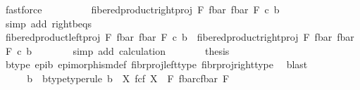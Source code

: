 \begin{isabellebody}
\ fastforce\isanewline
\ \ \ \ \isamarkupfalse%
\ \isamarkupfalse%
\ {\isachardoublequoteopen}{\isachardot}{\kern0pt}{\isachardot}{\kern0pt}{\isachardot}{\kern0pt}\ {\isacharequal}{\kern0pt}\ fibered{\isacharunderscore}{\kern0pt}product{\isacharunderscore}{\kern0pt}right{\isacharunderscore}{\kern0pt}proj\ F\ {\isacharparenleft}{\kern0pt}f{\isacharunderscore}{\kern0pt}bar{\isacharparenright}{\kern0pt}\ {\isacharparenleft}{\kern0pt}f{\isacharunderscore}{\kern0pt}bar{\isacharparenright}{\kern0pt}\ F\ {\isasymcirc}\isactrlsub c\ b{\isachardoublequoteclose}\isanewline
\ \ \ \ \ \ \isamarkupfalse%
\ {\isacharparenleft}{\kern0pt}simp\ add{\isacharcolon}{\kern0pt}\ right{\isacharunderscore}{\kern0pt}b{\isacharunderscore}{\kern0pt}eqs{\isacharparenright}{\kern0pt}\isanewline
\ \ \ \ \isamarkupfalse%
\ \isamarkupfalse%
\ {\isachardoublequoteopen}fibered{\isacharunderscore}{\kern0pt}product{\isacharunderscore}{\kern0pt}left{\isacharunderscore}{\kern0pt}proj\ F\ {\isacharparenleft}{\kern0pt}f{\isacharunderscore}{\kern0pt}bar{\isacharparenright}{\kern0pt}\ {\isacharparenleft}{\kern0pt}f{\isacharunderscore}{\kern0pt}bar{\isacharparenright}{\kern0pt}\ F\ {\isasymcirc}\isactrlsub c\ b\ {\isacharequal}{\kern0pt}\ fibered{\isacharunderscore}{\kern0pt}product{\isacharunderscore}{\kern0pt}right{\isacharunderscore}{\kern0pt}proj\ F\ {\isacharparenleft}{\kern0pt}f{\isacharunderscore}{\kern0pt}bar{\isacharparenright}{\kern0pt}\ {\isacharparenleft}{\kern0pt}f{\isacharunderscore}{\kern0pt}bar{\isacharparenright}{\kern0pt}\ F\ {\isasymcirc}\isactrlsub c\ b{\isachardoublequoteclose}\isanewline
\ \ \ \ \ \ \isamarkupfalse%
\ {\isacharparenleft}{\kern0pt}simp\ add{\isacharcolon}{\kern0pt}\ calculation{\isacharparenright}{\kern0pt}\isanewline
\ \ \ \ \isamarkupfalse%
\ \isamarkupfalse%
\ {\isacharquery}{\kern0pt}thesis\isanewline
\ \ \ \ \ \ \isamarkupfalse%
\ b{\isacharunderscore}{\kern0pt}type\ epi{\isacharunderscore}{\kern0pt}b\ epimorphism{\isacharunderscore}{\kern0pt}def{}\ fibr{\isacharunderscore}{\kern0pt}proj{\isacharunderscore}{\kern0pt}left{\isacharunderscore}{\kern0pt}type\ fibr{\isacharunderscore}{\kern0pt}proj{\isacharunderscore}{\kern0pt}right{\isacharunderscore}{\kern0pt}type\ \isamarkupfalse%
\ blast\isanewline
\ \ \isamarkupfalse%
\isanewline
\isanewline
\ \ \isanewline
\ \ \isanewline
\ \ \isamarkupfalse%
\ \isamarkupfalse%
\ b\ \ b{\isacharunderscore}{\kern0pt}type{\isacharbrackleft}{\kern0pt}type{\isacharunderscore}{\kern0pt}rule{\isacharbrackright}{\kern0pt}{\isacharcolon}{\kern0pt}\ {\isachardoublequoteopen}b\ {\isacharcolon}{\kern0pt}\ X\ \isactrlbsub f\isactrlesub {\isasymtimes}\isactrlsub c\isactrlbsub f\isactrlesub \ X\ {\isasymrightarrow}\ F\ \isactrlbsub {\isacharparenleft}{\kern0pt}f{\isacharunderscore}{\kern0pt}bar{\isacharparenright}{\kern0pt}\isactrlesub {\isasymtimes}\isactrlsub c\isactrlbsub {\isacharparenleft}{\kern0pt}f{\isacharunderscore}{\kern0pt}bar{\isacharparenright}{\kern0pt}\isactrlesub \ F{\isachardoublequoteclose}\ \isanewline

\end{isabellebody}
